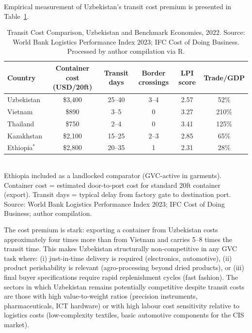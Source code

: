 Empirical measurement of Uzbekistan's transit cost premium is presented in Table~\ref{tab:transit_costs}.

\begin{table}[H]
 \centering
 \caption{Transit Cost Comparison, Uzbekistan and Benchmark Economies, 2022. Source: World Bank Logistics Performance Index 2023; IFC Cost of Doing Business. Processed by author compilation via R.}
 \label{tab:transit_costs}
 \small
 \begin{tabular}{@{}lccccc@{}}
 \toprule
 Country & Container cost (USD/20ft) & Transit days & Border crossings & LPI score & Trade/GDP \\
 \midrule
 Uzbekistan & \$3,400 & 25--40 & 3--4 & 2.57 & 52\% \\
 Vietnam & \$890 & 3--5 & 0 & 3.27 & 210\% \\
 Thailand & \$750 & 2--4 & 0 & 3.41 & 125\% \\
 Kazakhstan & \$2,100 & 15--25 & 2--3 & 2.85 & 65\% \\
 Ethiopia$^*$ & \$2,800 & 20--35 & 1 & 2.31 & 28\% \\
 \bottomrule
 \end{tabular}
 \\\smallskip
 \small * Ethiopia included as a landlocked comparator (GVC-active in garments). Container cost = estimated door-to-port cost for standard 20ft container (export). Transit days = typical delay from factory gate to destination port. Source: World Bank Logistics Performance Index 2023; IFC Cost of Doing Business; author compilation.
\end{table}

The cost premium is stark: exporting a container from Uzbekistan costs approximately four times more than from Vietnam and carries 5--8 times the transit time. This makes Uzbekistan structurally non-competitive in any GVC task where: (i) just-in-time delivery is required (electronics, automotive), (ii) product perishability is relevant (agro-processing beyond dried products), or (iii) final buyer specifications require rapid replenishment cycles (fast fashion). The sectors in which Uzbekistan remains potentially competitive despite transit costs are those with high value-to-weight ratios (precision instruments, pharmaceuticals, ICT hardware) or with high labour cost sensitivity relative to logistics costs (low-complexity textiles, basic automotive components for the CIS market).

